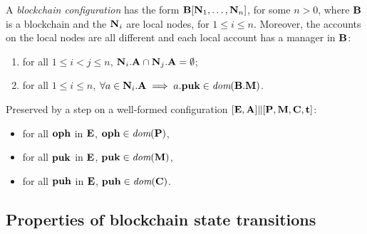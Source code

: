 \documentclass[a4paper]{llncs}
\begin{document}
A \emph{blockchain configuration} has the form
$\textbf{B}[ \textbf{N}_1, \dots, \textbf{N}_n]$, for some $n>0$, where $\textbf{B}$ is a
blockchain and the $\textbf{N}_i$ are local nodes, for $1\le i\le n$.
Moreover, the accounts on the local nodes are all different and each
local account has a manager in $\textbf{B}$:
\begin{enumerate}
\item for all $1\le i< j\le n$, $\textbf{N}_i.\textbf{A} \cap
  \textbf{N}_j.\textbf{A} = \emptyset$;
\item for all $1\le i \le n$, 
    $\forall a \in \textbf{N}_i.\textbf{A} \implies a.\textbf{puk} \in \textit{dom}( \textbf{B}.\textbf{M})$.
\end{enumerate}
\begin{definition}
  Preserved by a step on a well-formed configuration $ [\textbf{E}, \textbf{A}] \|
  [\textbf{P}, \textbf{M}, \textbf{C}, \textbf{t}]$:
  \begin{itemize}
  \item for all $\textbf{oph}$ in $\textbf{E}$, $\textbf{oph} \in \textit{dom} (\textbf{P})$,
  \item for all $\textbf{puk}$ in $\textbf{E}$, $\textbf{puk} \in \textit{dom} (\textbf{M})$,
  \item for all $\textbf{puh}$ in $\textbf{E}$, $\textbf{puh} \in \textit{dom} (\textbf{C})$.
  \end{itemize}
\end{definition}

\clearpage{}
\subsection{Properties of blockchain state transitions}
\end{document}
